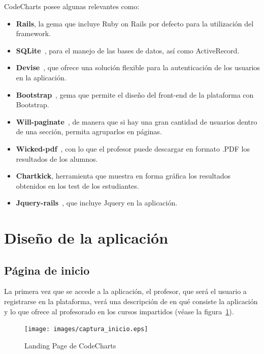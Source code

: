 CodeCharts posee algunas relevantes como:

\begin{itemize}
    \item \textbf{Rails}, la gema que incluye Ruby on Rails por defecto para la utilización del framework.
    \item \textbf{SQLite}~\cite{SQLite}, para el manejo de las bases de datos, así como ActiveRecord.
    \item \textbf{Devise}~\cite{Devise}, que ofrece una solución flexible para la autenticación de los usuarios en la aplicación.
    \item \textbf{Bootstrap}~\cite{BootstrapGem}, gema que permite el diseño del front-end de la plataforma con Bootstrap.
    \item \textbf{Will-paginate}~\cite{Paginate}, de manera que si hay una gran cantidad de usuarios dentro de una sección, permita agruparlos en páginas.
    \item \textbf{Wicked-pdf}~\cite{WickedPDF}, con lo que el profesor puede descargar en formato .PDF los resultados de los alumnos.
    \item \textbf{Chartkick}, herramienta que muestra en forma gráfica los resultados obtenidos en los test de los estudiantes.
    \item \textbf{Jquery-rails}~\cite{JqueryRails}, que incluye Jquery en la aplicación. 
\end{itemize}


\section{Diseño de la aplicación}
\label{1:sec:2}

\subsection{Página de inicio}
\label{1:sec:1}

La primera vez que se accede a la aplicación, el profesor, que será el usuario a registrarse en la plataforma, verá una descripción de en qué consiste la aplicación y lo que ofrece al profesorado en los cursos impartidos (véase la figura~\ref{fig:11}).

\begin{figure}[!th]
\begin{center}
\texttt{[image: images/captura\_inicio.eps]}
\caption{Landing Page de CodeCharts}
\label{fig:11}
\end{center}
\end{figure}

